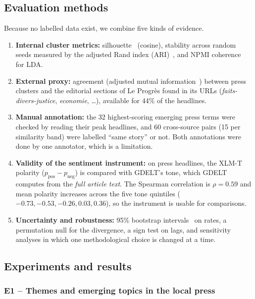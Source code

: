 \documentclass[pdflatex,sn-mathphys-num]{sn-jnl}
\begin{document}
\subsection{Evaluation methods}\label{sec:eval}

Because no labelled data exist, we combine five kinds of evidence.
\begin{enumerate}
\item \textbf{Internal cluster metrics:} silhouette~\cite{rousseeuw1987silhouette} (cosine), stability across random seeds measured by the adjusted Rand index (ARI)~\cite{hubert1985ari}, and NPMI coherence~\cite{bouma2009npmi} for LDA.
\item \textbf{External proxy:} agreement (adjusted mutual information~\cite{vinh2010ami}) between press clusters and the editorial sections of Le Progr\`es found in its URLs (\emph{faits-divers-justice}, \emph{economie}, \dots), available for 44\% of the headlines.
\item \textbf{Manual annotation:} the 32 highest-scoring emerging press terms were checked by reading their peak headlines, and 60 cross-source pairs (15 per similarity band) were labelled ``same story'' or not. Both annotations were done by one annotator, which is a limitation.
\item \textbf{Validity of the sentiment instrument:} on press headlines, the XLM-T polarity ($p_{\text{pos}}-p_{\text{neg}}$) is compared with GDELT's tone, which GDELT computes from the \emph{full article text}. The Spearman correlation is $\rho=0.59$ and mean polarity increases across the five tone quintiles ($-0.73, -0.53, -0.26, 0.03, 0.36$), so the instrument is usable for comparisons.
\item \textbf{Uncertainty and robustness:} 95\% bootstrap intervals~\cite{efron1993bootstrap} on rates, a permutation null for the divergence, a sign test on lags, and sensitivity analyses in which one methodological choice is changed at a time.
\end{enumerate}

\subsection{Experiments and results}\label{sec:results}

\subsubsection{E1 -- Themes and emerging topics in the local press}
\end{document}
